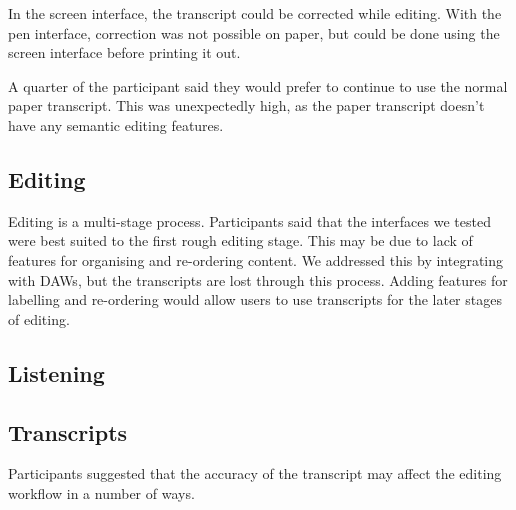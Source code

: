 In the screen interface, the transcript could be corrected while editing. With the pen interface, correction was not
possible on paper, but could be done using the screen interface before printing it out.

A quarter of the participant said they would prefer to continue to use the normal paper transcript. This was
unexpectedly high, as the paper transcript doesn't have any semantic editing features.




\subsection{Editing}

Editing is a multi-stage process. Participants said that the interfaces we tested were best suited to the first rough
editing stage. This may be due to lack of features for organising and re-ordering content. We addressed this by
integrating with DAWs, but the transcripts are lost through this process. Adding features for labelling and re-ordering
would allow users to use transcripts for the later stages of editing.

\subsection{Listening}

\subsection{Transcripts}

Participants suggested that the accuracy of the transcript may affect the editing workflow in a number of ways. 

